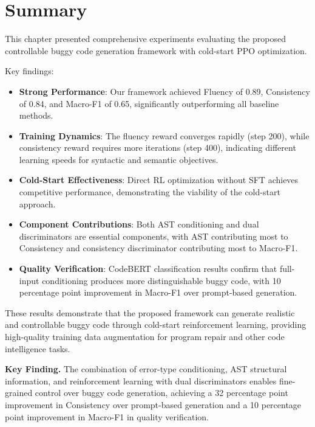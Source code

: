 \section{Summary}

This chapter presented comprehensive experiments evaluating the proposed controllable buggy code generation framework with cold-start PPO optimization.

Key findings:

\begin{itemize}
    \item \textbf{Strong Performance}: Our framework achieved Fluency of 0.89, Consistency of 0.84, and Macro-F1 of 0.65, significantly outperforming all baseline methods.
    \item \textbf{Training Dynamics}: The fluency reward converges rapidly (step 200), while consistency reward requires more iterations (step 400), indicating different learning speeds for syntactic and semantic objectives.
    \item \textbf{Cold-Start Effectiveness}: Direct RL optimization without SFT achieves competitive performance, demonstrating the viability of the cold-start approach.
    \item \textbf{Component Contributions}: Both AST conditioning and dual discriminators are essential components, with AST contributing most to Consistency and consistency discriminator contributing most to Macro-F1.
    \item \textbf{Quality Verification}: CodeBERT classification results confirm that full-input conditioning produces more distinguishable buggy code, with 10 percentage point improvement in Macro-F1 over prompt-based generation.
\end{itemize}

These results demonstrate that the proposed framework can generate realistic and controllable buggy code through cold-start reinforcement learning, providing high-quality training data augmentation for program repair and other code intelligence tasks.

\begingroup
\vspace{1em}
\textbf{Key Finding.} The combination of error-type conditioning, AST structural information, and reinforcement learning with dual discriminators enables fine-grained control over buggy code generation, achieving a 32 percentage point improvement in Consistency over prompt-based generation and a 10 percentage point improvement in Macro-F1 in quality verification.
\endgroup

\endgroup
\endinput

